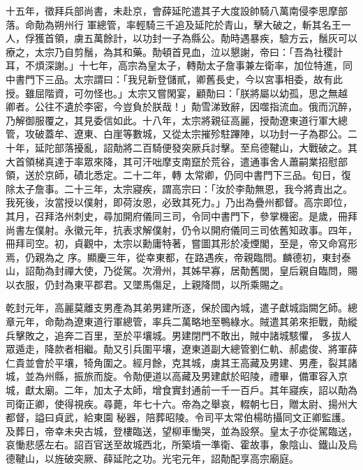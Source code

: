 \begin{pinyinscope}
 十五年，徵拜兵部尚書，未赴京，會薛延陀遣其子大度設帥騎八萬南侵李思摩部落。命勣為朔州行
 軍總管，率輕騎三千追及延陀於青山，擊大破之，斬其名王一人，俘獲首領，虜五萬餘計，以功封一子為縣公。勣時遇暴疾，驗方云，鬚灰可以療之，太宗乃自剪鬚，為其和藥。勣頓首見血，泣以懇謝，帝曰：「吾為社稷計耳，不煩深謝。」十七年，高宗為皇太子，轉勣太子詹事兼左衛率，加位特進，同中書門下三品。太宗謂曰：「我兒新登儲貳，卿舊長史，今以宮事相委，故有此授。雖屈階資，可勿怪也。」太宗又嘗閑宴，顧勣曰：「朕將屬以幼孤，思之無越
 卿者。公往不遺於李密，今豈負於朕哉！」勣雪涕致辭，因噬指流血。俄而沉醉，乃解御服覆之，其見委信如此。十八年，太宗將親征高麗，授勣遼東道行軍大總管，攻破蓋牟、遼東、白崖等數城，又從太宗摧殄駐蹕陣，以功封一子為郡公。二十年，延陀部落擾亂，詔勣將二百騎便發突厥兵討擊。至烏德鞬山，大戰破之。其大首領梯真達于率眾來降，其可汗咄摩支南竄於荒谷，遣通事舍人蕭嗣業招慰部領，送於京師，磧北悉定。二十二年，轉
 太常卿，仍同中書門下三品。旬日，復除太子詹事。二十三年，太宗寢疾，謂高宗曰：「汝於李勣無恩，我今將責出之。我死後，汝當授以僕射，即荷汝恩，必致其死力。」乃出為疊州都督。高宗即位，其月，召拜洛州刺史，尋加開府儀同三司，令同中書門下，參掌機密。是歲，冊拜尚書左僕射。永徽元年，抗表求解僕射，仍令以開府儀同三司依舊知政事。四年，冊拜司空。初，貞觀中，太宗以勳庸特著，嘗圖其形於凌煙閣，至是，帝又命寫形焉，仍親為之
 序。顯慶三年，從幸東都，在路遇疾，帝親臨問。麟德初，東封泰山，詔勣為封禪大使，乃從駕。次滑州，其姊早寡，居勣舊閭，皇后親自臨問，賜以衣服，仍封為東平郡君。又墜馬傷足，上親降問，以所乘賜之。



 乾封元年，高麗莫離支男產為其弟男建所逐，保於國內城，遣子獻城詣闕乞師。總章元年，命勣為遼東道行軍總管，率兵二萬略地至鴨綠水。賊遣其弟來拒戰，勣縱兵擊敗之，追奔二百里，至於平壤城。男建閉門不敢出，賊中諸城駭懼，
 多拔人眾遁走，降款者相繼。勣又引兵圍平壤，遼東道副大總管劉仁軌、郝處俊、將軍薛仁貴並會於平壤，犄角圍之。經月餘，克其城，虜其王高藏及男建、男產，裂其諸城，並為州縣，振旅而旋。令勣便道以高藏及男建獻於昭陵，禮畢，備軍容入京城，獻太廟。二年，加太子太師，增食實封通前一千一百戶。其年寢疾，詔以勣為司衛正卿，使得視疾。尋薨，年七十六。帝為之舉哀，輟朝七日，贈太尉、揚州大都督，謚曰貞武，給東園
 秘器，陪葬昭陵。令司平太常伯楊昉攝同文正卿監護。及葬日，帝幸未央古城，登樓臨送，望柳車慟哭，並為設祭。皇太子亦從駕臨送，哀慟悲感左右。詔百官送至故城西北，所築墳一準衛、霍故事，象陰山、鐵山及烏德鞬山，以旌破突厥、薛延陀之功。光宅元年，詔勣配享高宗廟庭。




\end{pinyinscope}
